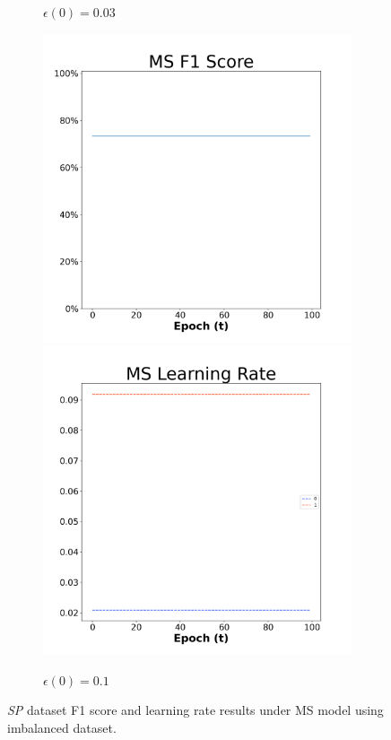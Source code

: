 \begin{figure}[H]
\begin{subfigure}{0.3\textwidth}
  \caption{$\epsilon(0)=0.03$}
\end{subfigure}\hfil %
\begin{subfigure}{0.3\textwidth}
  \includegraphics[width=\linewidth]{images/exper2/SP/MS_0.1_f1.png}
  \includegraphics[width=\linewidth]{images/exper2/SP/MS_0.1_lr.png}
  \caption{$\epsilon(0)=0.1$}
\end{subfigure}

\caption{\textit{SP} dataset F1 score and learning rate results under MS model using imbalanced dataset.}
\end{figure}

